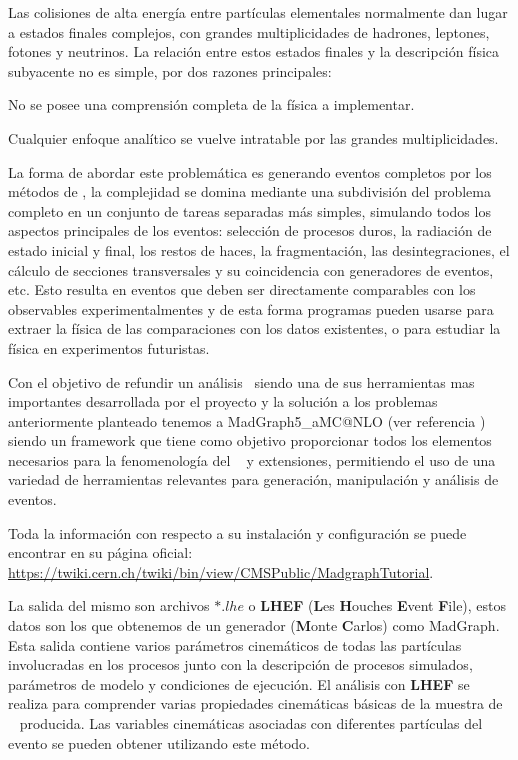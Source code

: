 Las colisiones de alta energía entre partículas elementales normalmente dan lugar a estados finales complejos, con grandes multiplicidades de hadrones, leptones, fotones y neutrinos. La relación entre estos estados finales y la descripción física subyacente no es simple, por dos razones principales:
\begin{itemize_f}
\item[-] No se posee una comprensión completa de la física a implementar.
\item[-] Cualquier enfoque analítico se vuelve intratable por las grandes multiplicidades.
\end{itemize_f}

La forma de abordar este problemática es generando eventos completos por los métodos de \MC, la complejidad se domina mediante una subdivisión del problema completo en un conjunto de tareas separadas más simples, simulando todos los aspectos principales de los eventos: selección de procesos duros, la radiación de estado inicial y final, los restos de haces, la fragmentación, las desintegraciones, el cálculo de secciones transversales y su coincidencia con generadores de eventos, etc. Esto resulta en eventos que deben ser directamente comparables con los observables experimentalmentes y de esta forma programas pueden usarse para extraer la física de las comparaciones con los datos existentes, o para estudiar la física en experimentos futuristas.

Con el objetivo de refundir un análisis \LHC ~siendo una de sus herramientas mas importantes desarrollada por el proyecto y la solución a los problemas anteriormente planteado tenemos a MadGraph5\_aMC@NLO (ver referencia \cite{alwall_automated_2014}) siendo un framework que tiene como objetivo proporcionar todos los elementos necesarios para la fenomenología del \ME ~ y extensiones, permitiendo el uso de una variedad de herramientas relevantes para generación, manipulación y análisis de eventos. 

Toda la información con respecto a su instalación y configuración se puede encontrar en su página oficial: \url{https://twiki.cern.ch/twiki/bin/view/CMSPublic/MadgraphTutorial}. 

La salida del mismo son archivos $*.lhe$ o \textbf{LHEF} (\textbf{L}es \textbf{H}ouches \textbf{E}vent \textbf{F}ile), estos datos son los que obtenemos de un generador \MC (\textbf{M}onte \textbf{C}arlos) como MadGraph. Esta salida contiene varios parámetros cinemáticos de todas las partículas involucradas en los procesos junto con la descripción de procesos simulados, parámetros de modelo y condiciones de ejecución. El análisis con \textbf{LHEF} se realiza para comprender varias propiedades cinemáticas básicas de la muestra de \MC ~ producida. Las variables cinemáticas asociadas con diferentes partículas del evento se pueden obtener utilizando este método.


